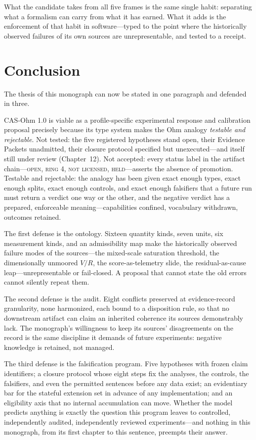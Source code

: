What the candidate takes from all five frames is the same single habit: separating what a formalism can carry from what it has earned. What it adds is the enforcement of that habit in software---typed to the point where the historically observed failures of its own sources are unrepresentable, and tested to a receipt.

\section{Conclusion}\label{evid:sec:conclusion}

The thesis of this monograph can now be stated in one paragraph and defended in three.

CAS-Ohm 1.0 is viable as a profile-specific experimental response and calibration proposal precisely because its type system makes the Ohm analogy \emph{testable and rejectable}. Not tested: the five registered hypotheses stand open, their Evidence Packets unadmitted, their closure protocol specified but unexecuted---and itself still under review (Chapter~12). Not accepted: every status label in the artifact chain---\textsc{open}, \textsc{ring 4}, \textsc{not licensed}, \textsc{held}---asserts the absence of promotion. Testable and rejectable: the analogy has been given exact enough types, exact enough splits, exact enough controls, and exact enough falsifiers that a future run must return a verdict one way or the other, and the negative verdict has a prepared, enforceable meaning---capabilities confined, vocabulary withdrawn, outcomes retained.

The first defense is the ontology. Sixteen quantity kinds, seven units, six measurement kinds, and an admissibility map make the historically observed failure modes of the sources---the mixed-scale saturation threshold, the dimensionally unmoored $V/R$, the score-as-telemetry slide, the residual-as-cause leap---unrepresentable or fail-closed. A proposal that cannot state the old errors cannot silently repeat them.

The second defense is the audit. Eight conflicts preserved at evidence-record granularity, none harmonized, each bound to a disposition rule, so that no downstream artifact can claim an inherited coherence its sources demonstrably lack. The monograph's willingness to keep its sources' disagreements on the record is the same discipline it demands of future experiments: negative knowledge is retained, not managed.

The third defense is the falsification program. Five hypotheses with frozen claim identifiers; a closure protocol whose eight steps fix the analyses, the controls, the falsifiers, and even the permitted sentences before any data exist; an evidentiary bar for the stateful extension set in advance of any implementation; and an eligibility axis that no internal accumulation can move. Whether the model predicts anything is exactly the question this program leaves to controlled, independently audited, independently reviewed experiments---and nothing in this monograph, from its first chapter to this sentence, preempts their answer.

